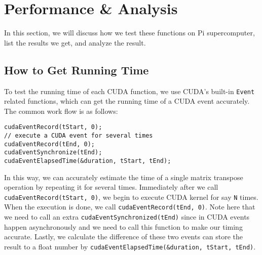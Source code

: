 \documentclass{article}
\begin{document}
\section{Performance \& Analysis}
In this section, we will discuss how we test these functions on Pi supercomputer, list the results we get, and analyze the result.
\subsection{How to Get Running Time}
To test the running time of each CUDA function, we use CUDA's built-in \verb|Event| related functions, which can get the running time of a CUDA event accurately. The common work flow is as follows:
\begin{lstlisting}[caption=Workflow of Time Measuring]
cudaEventRecord(tStart, 0);
// execute a CUDA event for several times
cudaEventRecord(tEnd, 0);
cudaEventSynchronize(tEnd);
cudaEventElapsedTime(&duration, tStart, tEnd);
\end{lstlisting}
In this way, we can accurately estimate the time of a single matrix transpose operation by repeating it for several times. Immediately after we call \verb|cudaEventRecord(tStart, 0)|, we begin to execute CUDA kernel for say \verb|N| times. When the execution is done, we call \verb|cudaEventRecord(tEnd, 0)|. Note here that we need to call an extra \verb|cudaEventSynchronized(tEnd)| since in CUDA events happen asynchronously and we need to call this function to make our timing accurate. Lastly, we calculate the difference of these two events can store the result to a float number by \verb|cudaEventElapsedTime(&duration, tStart, tEnd)|.
\end{document}
